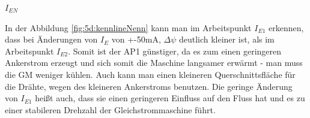 \begin{center}
	$ I_{EN} $
\end{center}

In der Abbildung \ref{fig:5d:kennlineNenn} kann man im Arbeitspunkt $ I_{E1} $ erkennen, dass bei Änderungen von $ I_{E} $ von +-50mA, $ \Delta\psi $ deutlich kleiner ist, als im Arbeitspunkt $ I_{E2} $. Somit ist der AP1 günstiger, da es zum einen geringeren Ankerstrom erzeugt und sich somit die Maschine langsamer erwärmt - man muss die GM weniger kühlen. Auch kann man einen kleineren Querschnittsfläche für die Drähte, wegen des kleineren Ankerstroms benutzen. Die geringe Änderung von $ I_{E1} $ heißt auch, dass sie einen geringeren Einfluss auf den Fluss hat und es zu einer stabileren Drehzahl der Gleichstrommaschine führt.